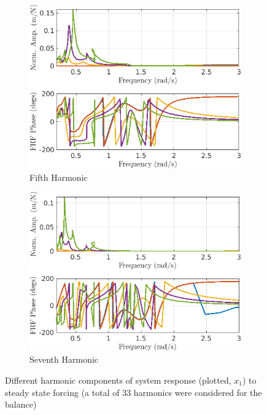 \documentclass[12pt]{article}
\begin{document}
\begin{figure}[!h]
  \begin{subfigure}{0.5\textwidth}
    \includegraphics[width=\linewidth]{FIGS/B_FRESP_hi5_33}
    \caption{Fifth Harmonic}
  \end{subfigure}%
  \begin{subfigure}{0.5\textwidth}
    \includegraphics[width=\linewidth]{FIGS/B_FRESP_hi7_33}
    \caption{Seventh Harmonic}
  \end{subfigure}  
  \caption{Different harmonic components of system response (plotted,
    $x_1$) to steady state forcing (a total of 33 harmonics were
    considered for the balance)}
\end{figure}
\end{document}
